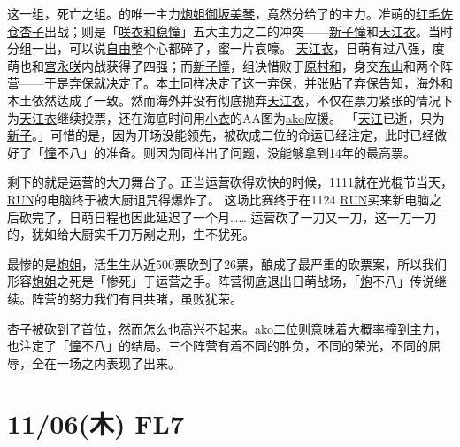 这一组，死亡之组。的唯一主力\uline{炮姐}\uline{御坂美琴}，竟然分给了的主力。准萌的\uline{红毛}\uline{佐仓杏子}出战；则是「\uline{咲衣和稳憧}」五大主力之二的冲突——\uline{新子憧}和\uline{天江衣}。当时分组一出，可以说\uline{自由}整个心都碎了，蜜一片哀嚎。
\uline{天江衣}，日萌有过八强，度萌也和\uline{宫永咲}内战获得了四强；而\uline{新子憧}，组决惜败于\uline{原村和}，身交\uline{东山}和两个阵营——于是弃保就决定了。本土同样决定了这一弃保，并张贴了弃保告知，海外和本土依然达成了一致。然而海外并没有彻底抛弃\uline{天江衣}，不仅在票力紧张的情况下为\uline{天江衣}继续投票，还在海底时间用\uline{小衣}的AA图为\uline{ako}应援。
「\uline{天江}已逝，只为\uline{新子}。」可惜的是，因为开场没能领先，被砍成二位的命运已经注定，此时已经做好了「\uline{憧}不八」的准备。则因为同样出了问题，没能够拿到14年的最高票。

剩下的就是运营的大刀舞台了。正当运营砍得欢快的时候，1111就在光棍节当天，\uline{RUN}的电脑终于被大厨诅咒得爆炸了。
这场比赛终于在1124 \uline{RUN}买来新电脑之后砍完了，日萌日程也因此延迟了一个月……
运营砍了一刀又一刀，这一刀一刀的，犹如给大厨实千刀万剐之刑，生不犹死。

最惨的是\uline{炮姐}，活生生从近500票砍到了26票，酿成了最严重的砍票案，所以我们形容\uline{炮姐}之死是「惨死」于运营之手。阵营彻底退出日萌战场，「\uline{炮}不八」传说继续。阵营的努力我们有目共睹，虽败犹荣。

杏子被砍到了首位，然而怎么也高兴不起来。\uline{ako}二位则意味着大概率撞到主力，也注定了「\uline{憧}不八」的结局。三个阵营有着不同的胜负，不同的荣光，不同的屈辱，全在一场之内表现了出来。

\clearpage

\section{11/06(木) FL7}


